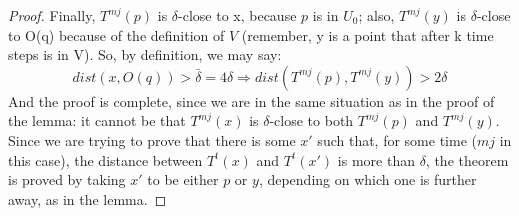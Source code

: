 \begin{proof}
    Finally, $T^{mj}(p)$ is $\delta$-close to x, because $p$ is in $U_0$; also, $T^{mj}(y)$ is $\delta$-close to O(q) because of the definition of $V$ (remember, y is a point that after k time steps is in V). So, by definition, we may say: \begin{equation*}
    dist(x, O(q))>\bar{\delta}=4\delta\Rightarrow dist(T^{mj}(p), T^{mj}(y))>2\delta
    \end{equation*}
    And the proof is complete, since we are in the same situation as in the proof of the lemma: it cannot be that $T^{mj}(x)$ is $\delta$-close to both $T^{mj}(p)$ and $T^{mj}(y)$. Since we are trying to prove that there is some $x'$ such that, for some time ($mj$ in this case), the distance between $T^t(x)$ and $T^t(x')$ is more than $\delta$, the theorem is proved by taking $x'$ to be either $p$ or $y$, depending on which one is further away, as in the lemma.
\end{proof}